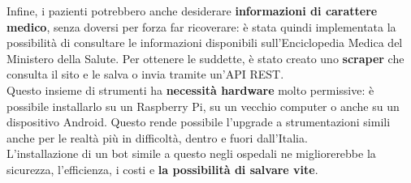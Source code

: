 \documentclass[11pt]{article}
\begin{document}
Infine, i pazienti potrebbero anche desiderare \textbf{informazioni di carattere medico}, senza doversi per forza far ricoverare: è stata quindi implementata la possibilità di consultare le informazioni disponibili sull'Enciclopedia Medica del Ministero della Salute. Per ottenere le suddette, è stato creato uno \textbf{scraper} che consulta il sito e le salva o invia tramite un'API REST.\\
Questo insieme di strumenti ha \textbf{necessità hardware} molto permissive: è possibile installarlo su un Raspberry Pi, su un vecchio computer o anche su un dispositivo Android. Questo rende possibile l'upgrade a strumentazioni simili anche per le realtà più in difficoltà, dentro e fuori dall'Italia.\\
L'installazione di un bot simile a questo negli ospedali ne migliorerebbe la sicurezza, l'efficienza, i costi e \textbf{la possibilità di salvare vite}.
\end{document}
